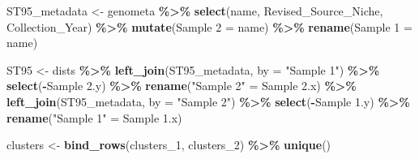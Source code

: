 \documentclass[
]{article}
\newenvironment{Shaded}{\begin{snugshade}}{\end{snugshade}}
\newcommand{\AttributeTok}[1]{\textcolor[rgb]{0.13,0.29,0.53}{#1}}
\newcommand{\FunctionTok}[1]{\textcolor[rgb]{0.13,0.29,0.53}{\textbf{#1}}}
\newcommand{\NormalTok}[1]{#1}
\newcommand{\OtherTok}[1]{\textcolor[rgb]{0.56,0.35,0.01}{#1}}
\newcommand{\SpecialCharTok}[1]{\textcolor[rgb]{0.81,0.36,0.00}{\textbf{#1}}}
\newcommand{\StringTok}[1]{\textcolor[rgb]{0.31,0.60,0.02}{#1}}
\begin{document}
\begin{Shaded}
\begin{Highlighting}[]
\NormalTok{ST95\_metadata }\OtherTok{\textless{}{-}}\NormalTok{ genometa }\SpecialCharTok{\%\textgreater{}\%}
  \FunctionTok{select}\NormalTok{(name, Revised\_Source\_Niche, Collection\_Year) }\SpecialCharTok{\%\textgreater{}\%}
  \FunctionTok{mutate}\NormalTok{(}\StringTok{\textasciigrave{}}\AttributeTok{Sample 2}\StringTok{\textasciigrave{}} \OtherTok{=}\NormalTok{ name) }\SpecialCharTok{\%\textgreater{}\%}
  \FunctionTok{rename}\NormalTok{(}\StringTok{\textquotesingle{}Sample 1\textquotesingle{}} \OtherTok{=}\NormalTok{ name)}

\NormalTok{ST95 }\OtherTok{\textless{}{-}}\NormalTok{ dists }\SpecialCharTok{\%\textgreater{}\%} \FunctionTok{left\_join}\NormalTok{(ST95\_metadata, }\AttributeTok{by =} \StringTok{"Sample 1"}\NormalTok{) }\SpecialCharTok{\%\textgreater{}\%} \FunctionTok{select}\NormalTok{(}\SpecialCharTok{{-}}\StringTok{\textasciigrave{}}\AttributeTok{Sample 2.y}\StringTok{\textasciigrave{}}\NormalTok{) }\SpecialCharTok{\%\textgreater{}\%} \FunctionTok{rename}\NormalTok{(}\StringTok{"Sample 2"} \OtherTok{=} \StringTok{\textasciigrave{}}\AttributeTok{Sample 2.x}\StringTok{\textasciigrave{}}\NormalTok{) }\SpecialCharTok{\%\textgreater{}\%} \FunctionTok{left\_join}\NormalTok{(ST95\_metadata, }\AttributeTok{by =} \StringTok{"Sample 2"}\NormalTok{) }\SpecialCharTok{\%\textgreater{}\%} \FunctionTok{select}\NormalTok{(}\SpecialCharTok{{-}}\StringTok{\textasciigrave{}}\AttributeTok{Sample 1.y}\StringTok{\textasciigrave{}}\NormalTok{) }\SpecialCharTok{\%\textgreater{}\%} \FunctionTok{rename}\NormalTok{(}\StringTok{"Sample 1"} \OtherTok{=} \StringTok{\textasciigrave{}}\AttributeTok{Sample 1.x}\StringTok{\textasciigrave{}}\NormalTok{)}

\NormalTok{clusters }\OtherTok{\textless{}{-}} \FunctionTok{bind\_rows}\NormalTok{(clusters\_1, clusters\_2) }\SpecialCharTok{\%\textgreater{}\%} \FunctionTok{unique}\NormalTok{()}


\end{Highlighting}
\end{Shaded}
\end{document}
